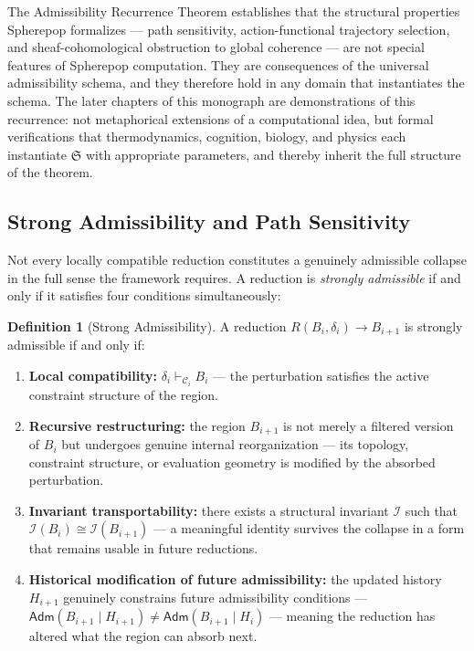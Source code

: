 \documentclass[12pt,openany]{book}
\theoremstyle{plain}
\theoremstyle{definition}
\newtheorem{definition}[theorem]{Definition}
\theoremstyle{remark}
\begin{document}
The Admissibility Recurrence Theorem establishes that the structural properties Spherepop formalizes — path sensitivity, action-functional trajectory selection, and sheaf-cohomological obstruction to global coherence — are not special features of Spherepop computation. They are consequences of the universal admissibility schema, and they therefore hold in any domain that instantiates the schema. The later chapters of this monograph are demonstrations of this recurrence: not metaphorical extensions of a computational idea, but formal verifications that thermodynamics, cognition, biology, and physics each instantiate $\mathfrak{S}$ with appropriate parameters, and thereby inherit the full structure of the theorem.

\subsection*{Strong Admissibility and Path Sensitivity}

Not every locally compatible reduction constitutes a genuinely admissible collapse in the full sense the framework requires. A reduction is \emph{strongly admissible} if and only if it satisfies four conditions simultaneously:

\begin{definition}[Strong Admissibility]
A reduction $R(B_i, \delta_i) \to B_{i+1}$ is strongly admissible if and only if:
\begin{enumerate}[label=(\arabic*)]
  \item \textbf{Local compatibility:} $\delta_i \vdash_{\mathcal{C}_i} B_i$ — the perturbation satisfies the active constraint structure of the region.
  \item \textbf{Recursive restructuring:} the region $B_{i+1}$ is not merely a filtered version of $B_i$ but undergoes genuine internal reorganization — its topology, constraint structure, or evaluation geometry is modified by the absorbed perturbation.
  \item \textbf{Invariant transportability:} there exists a structural invariant $\mathcal{I}$ such that $\mathcal{I}(B_i) \cong \mathcal{I}(B_{i+1})$ — a meaningful identity survives the collapse in a form that remains usable in future reductions.
  \item \textbf{Historical modification of future admissibility:} the updated history $H_{i+1}$ genuinely constrains future admissibility conditions — $\mathsf{Adm}(B_{i+1} \mid H_{i+1}) \neq \mathsf{Adm}(B_{i+1} \mid H_i)$ — meaning the reduction has altered what the region can absorb next.
\end{enumerate}
\end{definition}
\end{document}
